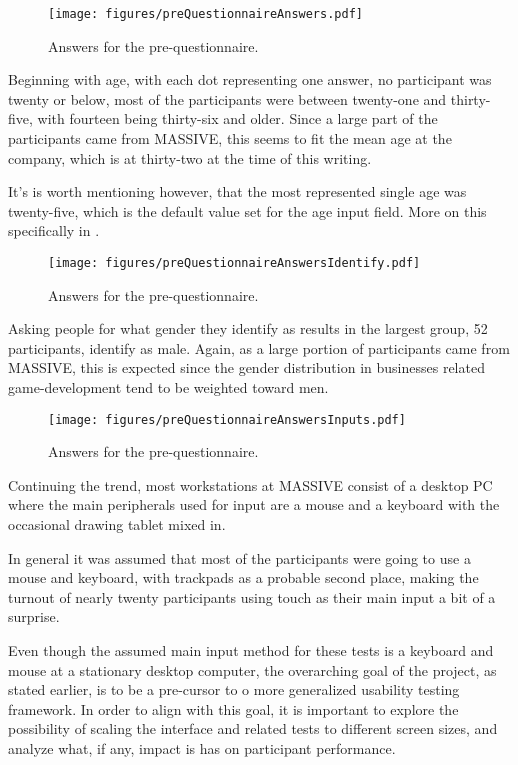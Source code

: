     \begin{figure}[h!]
      \centering
      \texttt{[image: figures/preQuestionnaireAnswers.pdf]}
      \caption{Answers for the pre-questionnaire.}
    \end{figure}

    Beginning with age, with each dot representing one answer, no
    participant was twenty or below, most of the  participants were between
    twenty-one and thirty-five, with fourteen being thirty-six and older.
    Since a large part of the participants came from MASSIVE, this seems to
    fit the mean age at the company, which is at thirty-two{\findref} at
    the time of this writing.

    It's is worth mentioning however, that the most represented single age
    was twenty-five, which is the default value set for the age input
    field. More on this specifically in .

    \begin{figure}[h!]
      \centering
      \texttt{[image: figures/preQuestionnaireAnswersIdentify.pdf]}
      \caption{Answers for the pre-questionnaire.}
    \end{figure}

    Asking people for what gender they identify as results in the largest
    group, 52 participants, identify as male. Again, as a large portion of
    participants came from MASSIVE, this is expected since the gender
    distribution in businesses related game-development tend to be weighted
    toward men\findref\findref.

    \begin{figure}[h!]
      \centering
      \texttt{[image: figures/preQuestionnaireAnswersInputs.pdf]}
      \caption{Answers for the pre-questionnaire.}
    \end{figure}

    Continuing the trend, most workstations at MASSIVE consist of a
    desktop PC where the main peripherals used for input are a mouse and a
    keyboard with the occasional drawing tablet mixed in.

    In general it was assumed that most of the participants were going to
    use a mouse and keyboard, with trackpads as a probable second place,
    making the turnout of nearly twenty participants using touch as their
    main input a bit of a surprise.

    Even though the assumed main input method for these tests is a keyboard
    and mouse at a stationary desktop computer, the overarching goal of the
    project, as stated earlier, is to be a pre-cursor to o more generalized
    usability testing framework. In order to align with this goal, it is
    important to explore the possibility of scaling the interface and
    related tests to different screen sizes, and analyze what, if any,
    impact is has on participant performance.

